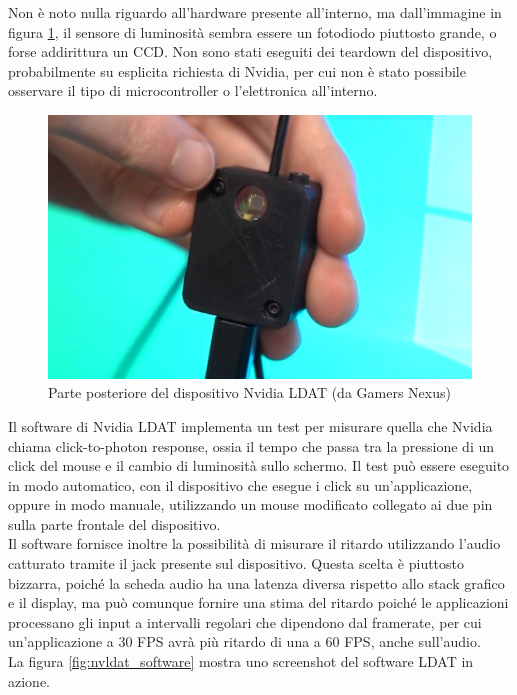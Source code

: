 Non è noto nulla riguardo all'hardware presente all'interno, ma dall'immagine in figura \ref{fig:nvldat_back}, il sensore di luminosità sembra essere un fotodiodo piuttosto grande, o forse addirittura un CCD. Non sono stati eseguiti dei teardown del dispositivo, probabilmente su esplicita richiesta di Nvidia, per cui non è stato possibile osservare il tipo di microcontroller o l'elettronica all'interno.

\begin{figure}[h!]
	\centering
	\includegraphics[width=\textwidth]{StatoDellArte_files/nvldat_back.jpg}
	\caption{Parte posteriore del dispositivo Nvidia LDAT (da Gamers Nexus)}
	\label{fig:nvldat_back}
\end{figure}

Il software di Nvidia LDAT implementa un test per misurare quella che Nvidia chiama click-to-photon response, ossia il tempo che passa tra la pressione di un click del mouse e il cambio di luminosità sullo schermo. Il test può essere eseguito in modo automatico, con il dispositivo che esegue i click su un'applicazione, oppure in modo manuale, utilizzando un mouse modificato collegato ai due pin sulla parte frontale del dispositivo.\\
Il software fornisce inoltre la possibilità di misurare il ritardo utilizzando l'audio catturato tramite il jack presente sul dispositivo. Questa scelta è piuttosto bizzarra, poiché la scheda audio ha una latenza diversa rispetto allo stack grafico e il display, ma può comunque fornire una stima del ritardo poiché le applicazioni processano gli input a intervalli regolari che dipendono dal framerate, per cui un'applicazione a 30 FPS avrà più ritardo di una a 60 FPS, anche sull'audio.\\
La figura \ref{fig:nvldat_software} mostra uno screenshot del software LDAT in azione.

